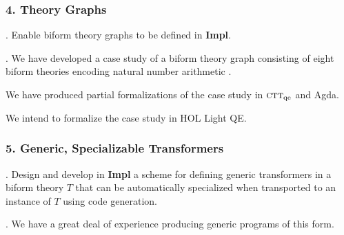 \documentclass[t,12pt,numbers,fleqn]{beamer}
\newcommand{\churchqe}{$\mbox{\sc ctt}_{\rm qe}$}
\begin{document}

\begin{frame}
\frametitle{4. Theory Graphs}
\bi

  \item {}. Enable biform theory graphs to be defined
    in \textbf{Impl}.

\pause

  \item {}.  We have developed a case study of a biform
    theory graph consisting of eight biform theories encoding natural
    number arithmetic \bbrown{[CarFar17]}.

  \bi

    \item We have produced partial formalizations of the case study in
      {\churchqe} and Agda.

    \item We intend to formalize the case study in HOL Light QE.

  \ei

\ei
\end{frame}


\begin{frame}
\frametitle{5. Generic, Specializable Transformers}
\bi

  \item {}. Design and develop in \textbf{Impl} a
    scheme for defining generic transformers in a biform theory $T$
    that can be automatically specialized when transported to an
    instance of $T$ using code generation.

\pause

  \item {}.  We have a great deal of experience producing
    generic programs of this form.

\ei
\end{frame}

\end{document}
